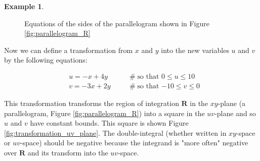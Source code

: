 \documentclass{article}
\theoremstyle{definition}
\newtheorem{example}{Example}[section]
\begin{document}
\begin{example}
\begin{figure}[H]
{
  }	
  \caption{Equations of the sides of the parallelogram shown in Figure \ref{fig:parallelogram_R}}
  \label{fig:parallelogram_sides}
\end{figure}

\bigskip
\noindent
Now we can define a transformation from $x$ and $y$ into the new variables $u$ and $v$
by the following equations:

\bigskip
\begin{equation*}
\begin{array}{lllll}
&u = -x + 4y  &&& \mathrel{\#} \text{so that $0 \leq u \leq 10$} \\
[5pt]
&v = -3x + 2y &&& \mathrel{\#} \text{so that $-10 \leq v \leq 0$}
\end{array}
\end{equation*}

\bigskip
\noindent
This transformation transforms the region of integration 
$\mathbf{R}$ in the $xy$-plane (a parallelogram,
Figure \ref{fig:parallelogram_R}) into a square in the
$uv$-plane and so $u$ and $v$ have constant bounds. This
square is shown Figure \ref{fig:transformation_uv_plane}. 
The double-integral (whether written in $xy$-space or $uv$-space) 
should be negative because the integrand is "more often" 
negative over $\mathbf{R}$ and its transform into
the $uv$-space.


\end{example}
\end{document}
